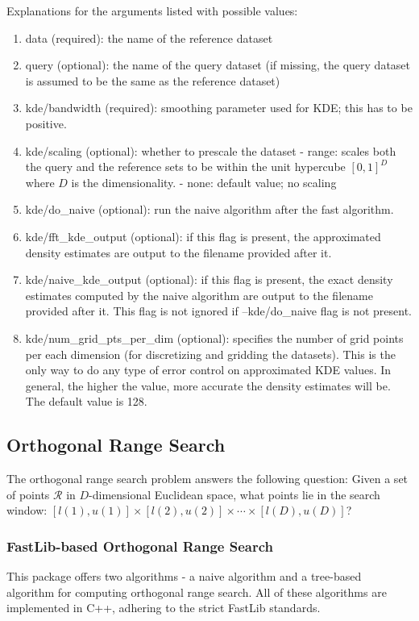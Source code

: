 \documentclass[letter]{report}
\begin{document}
Explanations for the arguments listed with possible values:

\begin{enumerate}
\item{data (required): the name of the reference dataset}
\item{query (optional): the name of the query dataset (if missing, the
 query dataset is assumed to be the same as the reference dataset)}
\item{kde/bandwidth (required): smoothing parameter used for KDE; this
 has to be positive.}
\item{kde/scaling (optional): whether to prescale the dataset - range:
scales both the query and the reference sets to be within the unit
hypercube $[0, 1]^D$ where $D$ is the dimensionality.  - none: default
value; no scaling}
\item{kde/do\_naive (optional): run the naive algorithm after the fast
algorithm.}
\item{kde/fft\_kde\_output (optional): if this flag is present, the
approximated density estimates are output to the filename provided
after it.}
\item{kde/naive\_kde\_output (optional): if this flag is present, the
 exact density estimates computed by the naive algorithm are output to
 the filename provided after it. This flag is not ignored if
 --kde/do\_naive flag is not present.}
\item{kde/num\_grid\_pts\_per\_dim (optional): specifies the number of
grid points per each dimension (for discretizing and gridding the
datasets). This is the only way to do any type of error control on
approximated KDE values. In general, the higher the value, more
accurate the density estimates will be. The default value is 128.}
\end{enumerate}

\subsection{Orthogonal Range Search}
The orthogonal range search problem answers the following question:
Given a set of points $\mathcal{R}$ in $D$-dimensional Euclidean
space, what points lie in the search window: $[l(1), u(1)]\times
[l(2),u(2)]\times \cdots \times [l(D),u(D)]$?

\subsubsection{FastLib-based Orthogonal Range Search}
This package offers two algorithms - a naive algorithm and a
tree-based algorithm for computing orthogonal range search. All of
these algorithms are implemented in C++, adhering to the strict
FastLib standards.
\end{document}
